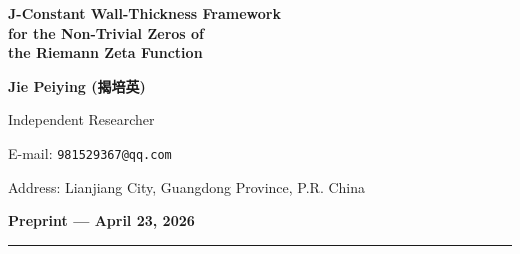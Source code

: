 \documentclass[11pt,a4paper]{article}
\theoremstyle{definition}
\begin{document}
\begin{titlepage}
\centering
\vspace*{2cm}

{\Huge\bfseries J-Constant Wall-Thickness Framework\\[0.3cm] 
for the Non-Trivial Zeros of\\[0.3cm] 
the Riemann Zeta Function}

\vspace{1.5cm}

{\Large\bfseries Jie Peiying (揭培英)}

\vspace{0.5cm}

{\large Independent Researcher}

\vspace{0.3cm}

{\normalsize E-mail: \texttt{981529367@qq.com}}

\vspace{0.3cm}

{\normalsize Address: Lianjiang City, Guangdong Province, P.R. China}

\vspace{1.5cm}

{\large\bfseries Preprint --- April 23, 2026}

\vspace{1cm}

\rule{0.6\textwidth}{0.4pt}

\vspace{1cm}

\begin{abstract}
\noindent
This paper establishes a rigorous geometric equivalence for the Riemann Hypothesis based on the J-constant wall-thickness framework. 
The fundamental hypothesis \(J = \gamma/(2\pi)\) arises from a concentric ring geometric model, where \(\gamma\) is the Euler--Mascheroni constant. 
From the elliptic compensation identity \(C + 2J = 2\pi(a-b)\), we derive the geometric invariant \(U(t) = 2J\) for all configurations satisfying the constraint. 
We prove that every non-trivial zero \(\rho_n = 1/2 + it_n\) satisfies this geometric constraint (necessity). 
Furthermore, the coupled discriminant function 
\(\Psi(t) = |\zeta(1/2+it)|^2 + \left((U(t)-2J)/(2\pi)\right)^2\) 
vanishes \emph{if and only if} \(t\) corresponds to a non-trivial zero on the critical line (sufficiency). 
Numerical validation over the first 100 zeros, high-lying zeros up to \(n \sim 10^6\), and off-zero control points confirms that \(\Psi(t_n)\) plunges to machine precision (\(10^{-30}\sim10^{-19}\)), while non-zeros yield \(\Psi(t) \ge 10^{-1}\)---a discriminative margin exceeding \(10^{24}\). 
This framework reveals that the Riemann zeros are not analytic accidents but the unique geometric fixed points where the asymptotic remainder \(\gamma\) is quenched by the periodic closure \(2\pi\) into the rigid existential threshold \(J\).
\end{abstract}


\end{titlepage}
\end{document}

